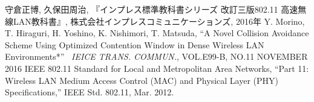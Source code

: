\documentclass[a4paper, 10pt]{ltjsarticle}
\begin{document}
\begin{thebibliography}{9}
  守倉正博, 久保田周治, 『インプレス標準教科書シリーズ 改訂三版802.11 高速無線LAN教科書』, 株式会社インプレスコミュニケーションズ, 2016年
  Y. Morino, T. Hiraguri, H. Yoshino, K. Nishimori, T. Matsuda, ``A Novel Collision Avoidance Scheme Using Optimized Contention Window in Dense Wireless LAN Environments*'' \, \textit{IEICE TRANS. COMMUN.}, VOL.E99-B, NO.11 NOVEMBER 2016
  IEEE 802.11 Standard for Local and Metropolitan Area
  Networks, “Part 11: Wireless LAN Medium Access Control (MAC) and Physical Layer (PHY) Speciﬁcations,”  IEEE Std. 802.11, Mar. 2012.
\end{thebibliography}
\end{document}
